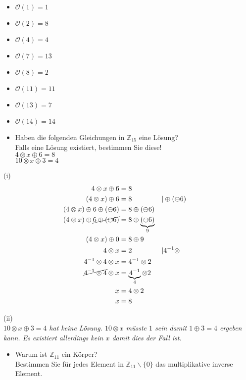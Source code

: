 \begin{itemize}
\item $\mathcal{O}(1) = 1$
\item $\mathcal{O}(2) = 8$
\item $\mathcal{O}(4) = 4$
\item $\mathcal{O}(7) = 13$
\item $\mathcal{O}(8) = 2$
\item $\mathcal{O}(11) = 11$
\item $\mathcal{O}(13) = 7$
\item $\mathcal{O}(14) = 14$
\end{itemize}

\newpage

\begin{itemize}[leftmargin=*, label={b)}]
\item Haben die folgenden Gleichungen in $\mathbb{Z}_{15}$ eine Lösung?\\
Falls eine Lösung existiert, bestimmen Sie diese!\\
$4 \otimes x \oplus 6 = 8$\\
$10 \otimes x \oplus 3 = 4$
\end{itemize}

(i)
\begin{align*}
4 \otimes x \oplus 6 &= 8\\
(4 \otimes x) \oplus 6 &= 8 &&| \oplus (\ominus 6)\\
(4 \otimes x) \oplus 6 \oplus (\ominus 6) &= 8 \oplus (\ominus 6)\\
(4 \otimes x) \oplus \cancel{6 \oplus (\ominus 6)} &= 8 \oplus \underbrace{(\ominus 6)}_{9}\\
(4 \otimes x) \oplus 0 &= 8 \oplus 9\\
4 \otimes x &= 2 &&| 4^{-1} \otimes\\
4^{-1} \otimes 4 \otimes x &= 4^{-1} \otimes 2\\
\cancel{4^{-1} \otimes 4} \otimes x &= \underbrace{4^{-1}}_{4} \otimes 2\\
x &= 4 \otimes 2\\
x &= 8
\end{align*}

(ii)\\

\textit{$10 \otimes x \oplus 3 = 4$ hat keine Lösung. $10 \otimes x$ müsste $1$ sein damit $1 \oplus 3 = 4$ ergeben kann. Es existiert allerdings kein $x$ damit dies der Fall ist.}\\

\begin{itemize}[leftmargin=*, label={c)}]
\item Warum ist $\mathbb{Z}_{11}$ ein Körper?\\
Bestimmen Sie für jedes Element in $\mathbb{Z}_{11} \backslash \{0\}$ das multiplikative inverse Element.
\end{itemize}

